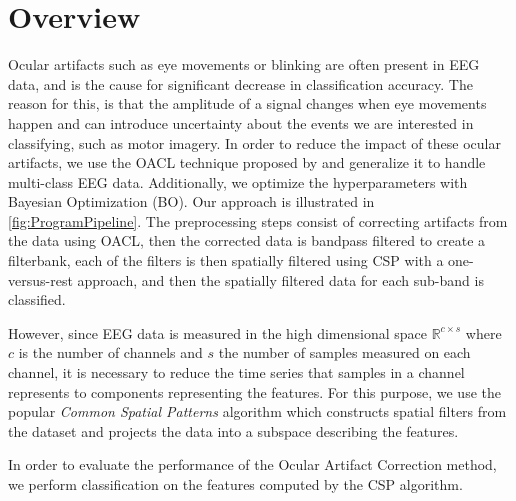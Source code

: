 \section{Overview}
Ocular artifacts such as eye movements or blinking are often present in EEG data, and is the cause for significant decrease in classification accuracy. The reason for this, is that the amplitude of a signal changes when eye movements happen and can introduce uncertainty about the events we are interested in classifying, such as motor imagery. In order to reduce the impact of these ocular artifacts, we use the OACL technique proposed by \citet{li2015ocular} and generalize it to handle multi-class EEG data. Additionally, we optimize the hyperparameters with Bayesian Optimization (BO). Our approach is illustrated in \cref{fig:ProgramPipeline}. The preprocessing steps consist of correcting artifacts from the data using OACL, then the corrected data is bandpass filtered to create a filterbank, each of the filters is then spatially filtered using CSP with a one-versus-rest approach, and then the spatially filtered data for each sub-band is classified.

However, since EEG data is measured in the high dimensional space $\mathbb{R}^{c \times s}$ where $c$ is the number of channels and $s$ the number of samples measured on each channel, it is necessary to reduce the time series that samples in a channel represents to components representing the features. For this purpose, we use the popular \emph{Common Spatial Patterns} algorithm which constructs spatial filters from the dataset and projects the data into a subspace describing the features.

In order to evaluate the performance of the Ocular Artifact Correction method, we perform classification on the features computed by the CSP algorithm.
